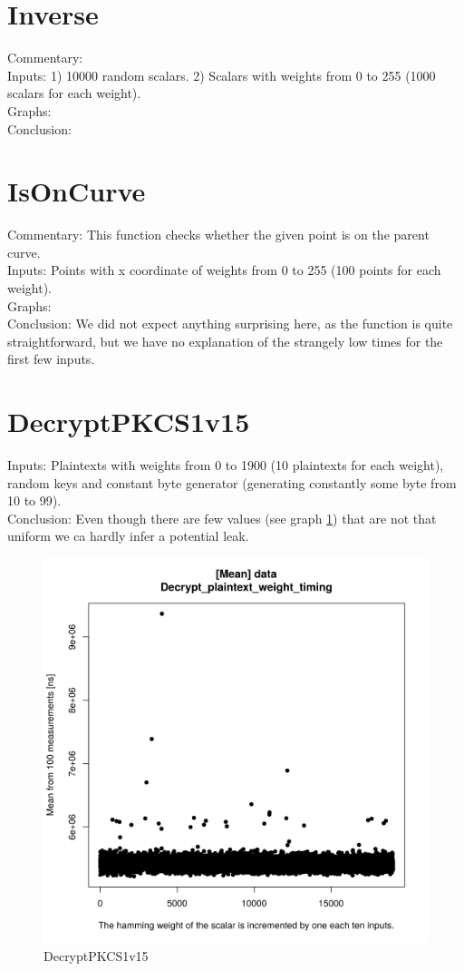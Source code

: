 \documentclass[a4paper]{scrartcl}
\begin{document}
\section{Inverse}
Commentary:
\\Inputs: 1) 10000 random scalars. 2) Scalars with weights from 0 to 255 (1000 scalars for each weight).
\\Graphs:
\\Conclusion:

\section{IsOnCurve}
Commentary: This function checks whether the given point is on the parent curve.
\\Inputs: Points with x coordinate of weights from 0 to 255 (100 points for each weight).
\\Graphs:
\\Conclusion: We did not expect anything surprising here, as the function is quite straightforward, but we have no explanation of the strangely low times for the first few inputs.
\fi

\section{DecryptPKCS1v15}
Inputs: Plaintexts with weights from 0 to 1900 (10 plaintexts for each weight), random keys and constant byte generator (generating constantly some byte from 10 to 99).
\\Conclusion: Even though there are  few values (see graph \ref{fig:DecryptPKCS1v15}) that are not that uniform we ca hardly infer a potential leak.

\begin{figure}
    \centering
  \includegraphics[width=0.4\linewidth]{data_Decrypt_plaintext_weight_timing-means.png}
  \caption{DecryptPKCS1v15}
  \label{fig:DecryptPKCS1v15}
\end{figure}
\end{document}
